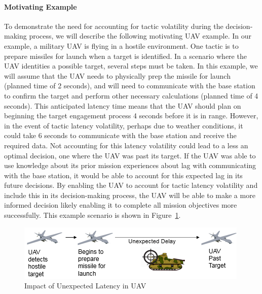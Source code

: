 \documentclass{article}
\begin{document}
\paragraph{Motivating Example} To demonstrate the need for accounting for tactic volatility during the decision-making process, we will describe the following motivating UAV example. In our example, a military UAV is flying in a hostile environment. One tactic is to prepare missiles for launch when a target is identified. In a scenario where the UAV identities a possible target, several steps must be taken. In this example, we will assume that the UAV needs to physically prep the missile for launch (planned time of 2 seconds), and will need to communicate with the base station to confirm the target and perform other necessary calculations (planned time of 4 seconds). This anticipated latency time means that the UAV should plan on beginning the target engagement process 4 seconds before it is in range. However, in the event of tactic latency volatility, perhaps due to weather conditions, it could take 6 seconds to communicate with the base station and receive the required data. Not accounting for this latency volatility could lead to a less an optimal decision, one where the UAV was past its target. If the UAV was able to use knowledge about its prior mission experiences about lag with communicating with the base station, it would be able to account for this expected lag in its future decisions. By enabling the UAV to account for tactic latency volatility and include this in its decision-making process, the UAV will be able to make a more informed decision likely enabling it to complete all mission objectives more successfully. This example scenario is shown in Figure~\ref{fig:UAVLatencyExample}. 

\begin{figure}[h]
	\centering
    \includegraphics[scale=0.7]{images/UAVLatencyExample.png}
    \caption{Impact of Unexpected Latency in UAV}
    \label{fig:UAVLatencyExample}
\end{figure}
\end{document}
